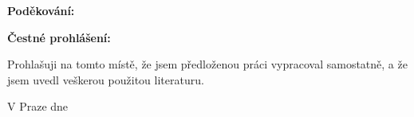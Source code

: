 {  %
  \thispagestyle{plain}
  \noindent
  \begin{minipage}[t]{\textwidth}\vspace{0pt}%
    \doccol \Large \textbf{Poděkování:}
  \end{minipage} \par
  \vspace{0.5cm}
  \noindent
  \begin{minipage}[t]{\textwidth}\vspace{0pt}%
    \@acknowledgment
  \end{minipage} \par
  \vfill
  \noindent
  \begin{minipage}[t]{\textwidth}\vspace{0pt}%
    \doccol \Large \textbf{Čestné prohlášení:}
  \end{minipage} \par
  \vspace{0.5cm}
  \noindent
  \begin{minipage}[t]{\textwidth}\vspace{0pt}%
    Prohlašuji na tomto místě, že jsem předloženou práci vypracoval samostatně, a že jsem uvedl veškerou použitou literaturu.
  \end{minipage} \par
  \vspace{1.5cm}
  \noindent
  \begin{minipage}[t]{0.7\textwidth}\vspace{0pt}%
    V Praze dne \@date
  \end{minipage}
  \begin{minipage}[t]{0.3\textwidth}\vspace{0pt}%
    \centering ~ \par \textbf{\dotfill} \par \@author
  \end{minipage}
  \cleardoublepage

}
